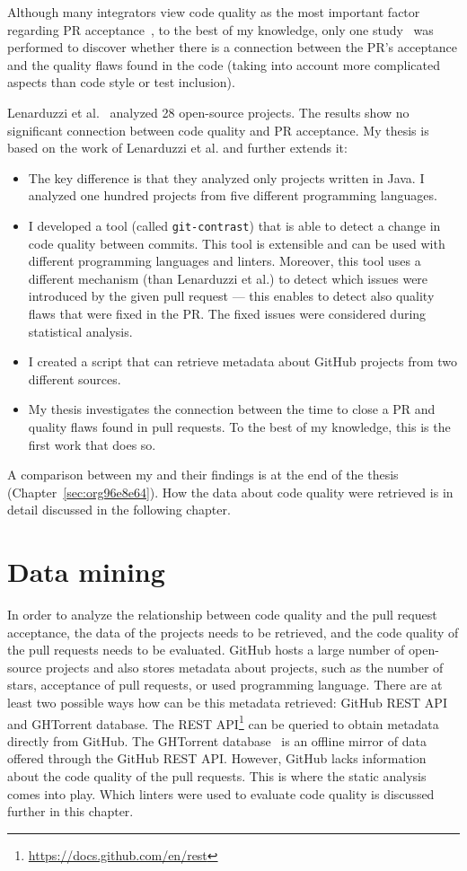 \documentclass[digital,oneside,oldtable,nolof,nolot,nocover]{fithesis4}
\begin{document}
Although many integrators view code quality as the most important factor
regarding PR acceptance~\cite{integrator}, to the best of my knowledge, only
one study~\cite{quality} was performed to discover whether there is a
connection between the PR's acceptance and the quality flaws found in the
code (taking into account more complicated aspects than code style or test
inclusion).

Lenarduzzi et al.~\cite{quality} analyzed 28 open-source projects. The results show
no significant connection between code quality and PR acceptance.
My thesis is based on the work of Lenarduzzi et al. and further extends it:
\begin{itemize}
\item The key difference is that they analyzed only projects written
in Java. I analyzed one hundred projects from five different programming languages.
\item I developed a tool (called \texttt{git-contrast}) that is able to detect a change in code quality between commits.
This tool is extensible and can be used with different programming languages and linters.
Moreover, this tool uses a different mechanism (than Lenarduzzi et al.) to detect which issues
were introduced by the given pull request --- this enables to detect also quality flaws that were fixed
in the PR. The fixed issues were considered during statistical analysis.
\item I created a script that can retrieve metadata about GitHub projects from two different sources.
\item My thesis investigates the connection between the time to close a PR and quality flaws found
in pull requests. To the best of my knowledge, this is the first work that does so.
\end{itemize}
A comparison between my and their findings is at the end of the thesis (Chapter~\ref{sec:org96e8e64}).
How the data about code quality were retrieved is in detail discussed in the following chapter.
\chapter{Data mining}
\label{sec:org0abe954}
In order to analyze the relationship between code quality and the pull request acceptance,
the data of the projects needs to be retrieved, and the
code quality of the pull requests needs to be evaluated.
GitHub hosts a large number of open-source projects and also stores metadata
about projects, such as the number of stars, acceptance of pull requests, or used programming language.
There are at least two possible ways how can be this metadata retrieved: GitHub REST API
and GHTorrent database. The REST API\footnote{\url{https://docs.github.com/en/rest}} can be queried to
obtain metadata directly from GitHub. The GHTorrent database~\cite{ghtorrent}
is an offline mirror of data offered through the GitHub REST API.
However, GitHub lacks information about the code quality of the pull requests.
This is where the static analysis comes into play. Which linters were used to evaluate code
quality is discussed further in this chapter.
\end{document}
